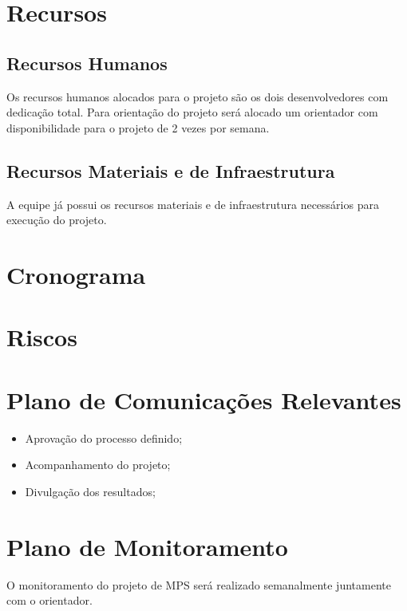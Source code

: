 \section{Recursos}

\subsection{Recursos Humanos}

	Os recursos humanos alocados para o projeto são os dois desenvolvedores com dedicação total. Para orientação do projeto será alocado um orientador com disponibilidade para o projeto de 2 vezes por semana.


\subsection{Recursos Materiais e de Infraestrutura}

	A equipe já possui os recursos materiais e de infraestrutura necessários para execução do projeto.

\section{Cronograma}

\section{Riscos}
  
  

\section{Plano de Comunicações Relevantes}

	\begin{itemize}
		\item Aprovação do processo definido;
		\item Acompanhamento do projeto;
		\item Divulgação dos resultados;

	\end{itemize}

\section{Plano de Monitoramento}
	
	O monitoramento do projeto de MPS será realizado semanalmente juntamente com o orientador.

